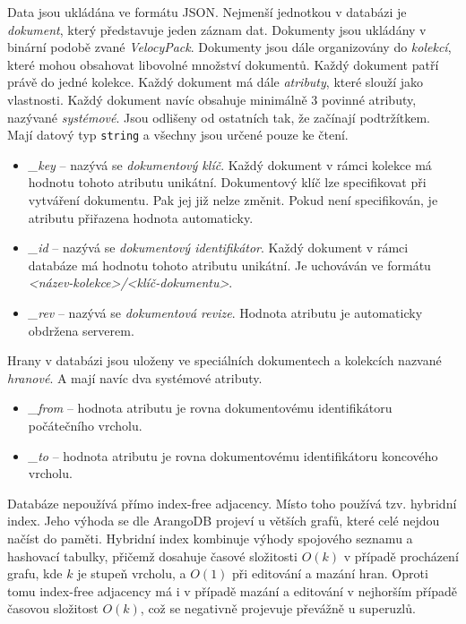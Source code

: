 \documentclass[
  program=infoi,
  biblatex=true,
  figures=true,
  glossaries=false,
  index,
  sourcecodes=true
]{kidiplom}
\begin{document}
Data jsou ukládána ve formátu JSON. Nejmenší jednotkou v databázi je \textit{dokument}, který představuje jeden záznam dat. Dokumenty jsou ukládány v binární podobě zvané \textit{VelocyPack}. Dokumenty jsou dále organizovány do \textit{kolekcí}, které mohou obsahovat libovolné množství dokumentů. Každý dokument patří právě do jedné kolekce. Každý dokument má dále \textit{atributy}, které slouží jako vlastnosti. Každý dokument navíc obsahuje minimálně 3 povinné atributy, nazývané \textit{systémové}. Jsou odlišeny od ostatních tak, že začínají podtržítkem. Mají datový typ \texttt{string} a všechny jsou určené pouze ke čtení.
\begin{itemize}
\item \textit{\_key} -- nazývá se \textit{dokumentový klíč}. Každý dokument v rámci kolekce má hodnotu tohoto atributu unikátní. Dokumentový klíč lze specifikovat při vytváření dokumentu. Pak jej již nelze změnit. Pokud není specifikován, je atributu přiřazena hodnota automaticky.
\item \textit{\_id} -- nazývá se \textit{dokumentový identifikátor}. Každý dokument v rámci databáze má hodnotu tohoto atributu unikátní. Je uchováván ve formátu \textit{<název-kolekce>/<klíč-dokumentu>}.
\item \textit{\_rev} -- nazývá se \textit{dokumentová revize}. Hodnota atributu je automaticky obdržena serverem.
\end{itemize}
Hrany v databázi jsou uloženy ve speciálních dokumentech a kolekcích nazvané \textit{hranové}. A mají navíc dva systémové atributy.
\begin{itemize}
\item \textit{\_from} -- hodnota atributu je rovna dokumentovému identifikátoru počátečního vrcholu.
\item \textit{\_to} -- hodnota atributu je rovna dokumentovému identifikátoru koncového vrcholu.
\end{itemize}

Databáze nepoužívá přímo index-free adjacency. Místo toho používá tzv. hybridní index. Jeho výhoda se dle ArangoDB projeví u větších grafů, které celé nejdou načíst do paměti. Hybridní index kombinuje výhody spojového seznamu a hashovací tabulky, přičemž dosahuje časové složitosti $O(k)$ v případě procházení grafu, kde $k$ je stupeň vrcholu, a $O(1)$ při editování a mazání hran. Oproti tomu index-free adjacency má i v případě mazání a editování v nejhorším případě časovou složitost $O(k)$, což se negativně projevuje převážně u superuzlů. \cite{hybridIndex}
\end{document}
